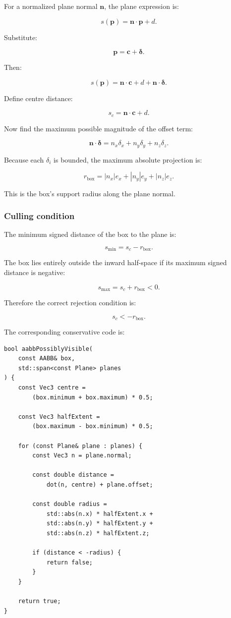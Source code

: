 For a normalized plane normal \(\mathbf n\), the plane expression is:

\[
 s(\mathbf p)=\mathbf n\cdot\mathbf p+d.
\]

Substitute:

\[
 \mathbf p=\mathbf c+\boldsymbol\delta.
\]

Then:

\[
 s(\mathbf p)= \mathbf n\cdot\mathbf c+d+ \mathbf n\cdot\boldsymbol\delta.
\]

Define centre distance:

\[
 \boxed{ s_c=\mathbf n\cdot\mathbf c+d }.
\]

Now find the maximum possible magnitude of the offset term:

\[
 \mathbf n\cdot\boldsymbol\delta = n_x\delta_x+n_y\delta_y+n_z\delta_z.
\]

Because each \(\delta_i\) is bounded, the maximum absolute projection is:

\[
 \boxed{ r_{\mathrm{box}}= |n_x|e_x+|n_y|e_y+|n_z|e_z }.
\]

This is the box's support radius along the plane normal.

\subsubsection{Culling condition}\label{culling-condition}

The minimum signed distance of the box to the plane is:

\[
 s_{\min}=s_c-r_{\mathrm{box}}.
\]

The box lies entirely outside the inward half-space if its maximum signed distance is negative:

\[
 s_{\max}=s_c+r_{\mathrm{box}}<0.
\]

Therefore the correct rejection condition is:

\[
 \boxed{ s_c<-r_{\mathrm{box}} }.
\]

The corresponding conservative code is:

\begin{verbatim}
bool aabbPossiblyVisible(
    const AABB& box,
    std::span<const Plane> planes
) {
    const Vec3 centre =
        (box.minimum + box.maximum) * 0.5;

    const Vec3 halfExtent =
        (box.maximum - box.minimum) * 0.5;

    for (const Plane& plane : planes) {
        const Vec3 n = plane.normal;

        const double distance =
            dot(n, centre) + plane.offset;

        const double radius =
            std::abs(n.x) * halfExtent.x +
            std::abs(n.y) * halfExtent.y +
            std::abs(n.z) * halfExtent.z;

        if (distance < -radius) {
            return false;
        }
    }

    return true;
}
\end{verbatim}

